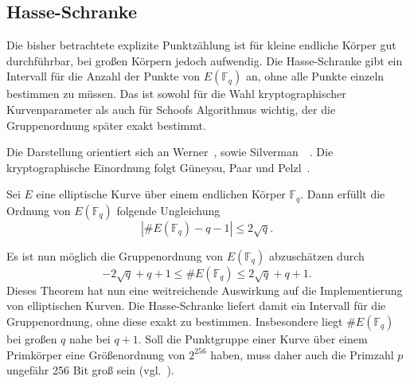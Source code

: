 \subsection{Hasse-Schranke}
Die bisher betrachtete explizite Punktzählung ist für kleine endliche Körper gut durchführbar, bei großen Körpern jedoch aufwendig. Die Hasse-Schranke gibt ein Intervall für die Anzahl der Punkte von $E(\mathbb F_q)$ an, ohne alle Punkte einzeln bestimmen zu müssen. Das ist sowohl für die Wahl kryptographischer Kurvenparameter als auch für Schoofs Algorithmus wichtig, der die Gruppenordnung später exakt bestimmt.

Die Darstellung orientiert sich an Werner~\cite[S.~60--63]{werner02}, sowie Silverman~\cite[S.~138]{silverman09}~\cite[S.85,100]{silverman06}. Die kryptographische Einordnung folgt Güneysu, Paar und Pelzl~\cite[S.~287]{guneysu24}.
\begin{satz}\label{def:hasse-schranke}
    Sei $E$ eine elliptische Kurve über einem endlichen Körper $\mathbb{F}_q$. Dann erfüllt die Ordnung von $E(\mathbb{F}_q)$ folgende Ungleichung
    \[|\#E(\mathbb{F}_q)-q-1 |\leq 2\sqrt q.\]
\end{satz}
Es ist nun möglich die Gruppenordnung von $E(\mathbb{F}_q)$ abzuschätzen durch
\[
    -2\sqrt{q}+q+1\leq \#E(\mathbb{F}_q)\leq 2\sqrt{q}+q+1.
\]
Dieses Theorem hat nun eine weitreichende Auswirkung auf die Implementierung von elliptischen Kurven. Die Hasse-Schranke liefert damit ein Intervall für die Gruppenordnung, ohne diese exakt zu bestimmen. Insbesondere liegt \(\#E(\mathbb F_q)\) bei großen \(q\) nahe bei \(q+1\). Soll die Punktgruppe einer Kurve über einem Primkörper eine Größenordnung von \(2^{256}\) haben, muss daher auch die Primzahl \(p\) ungefähr 256 Bit groß sein (vgl.~\cite[S.~287]{guneysu24}).

